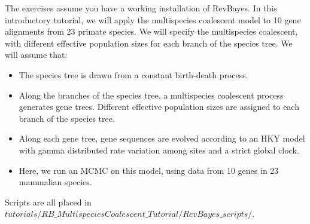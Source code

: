\vspace{20mm}

{\begin{framed}
\begin{center}
The exercises assume you have a working installation of RevBayes.
In this introductory tutorial, we will apply the multispecies coalescent model to 10 gene alignments from 23 primate species.
We will specify the multispecies coalescent, with different effective population sizes for each branch of the species tree.
We will assume that:
\begin{itemize}
\item The species tree is drawn from a constant birth-death process.
\item Along the branches of the species tree, a multispecies coalescent process generates gene trees. Different effective population sizes are assigned to each branch of the species tree.
\item Along each gene tree, gene sequences are evolved according to an HKY model with gamma distributed rate variation among sites and a strict global clock. 
\item Here, we run an MCMC on this model, using data from 10 genes in 23 mammalian species.
\end{itemize}
Scripts are all placed in {\footnotesize \emph{$tutorials/RB\_MultispeciesCoalescent\_Tutorial/RevBayes\_scripts/$}}. 
\end{center}
\end{framed}}
\vspace{5mm}

